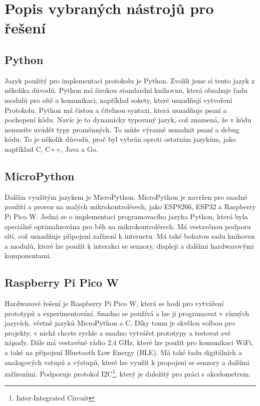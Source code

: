 \documentclass[12pt]{report}			%
\begin{document}
\section{Popis vybraných  nástrojů pro řešení}

\subsection{Python}

Jazyk použitý pro implementaci protokolu je Python. Zvolili jsme si tento jazyk z několika důvodů. 
Python má širokou standardní knihovnu, která obsahuje řadu modulů pro sítě a komunikaci, například sokety, které usnadňují vytvoření Protokolu.
Python má čistou a čitelnou syntaxi, která usnadňuje psaní a pochopení kódu. Navíc je to dynamicky typovaný jazyk, což znamená, že v kódu nemusíte uvádět typy proměnných. To může výrazně usnadnit psaní a debug kódu.
To je několik důvodů, proč byl vybrán oproti ostatním jazykům, jako například C, C++, Java a Go.

\subsection{MicroPython}

Dalším využitým jazykem je MicroPython. MicroPython je navržen pro snadné použití a provoz na malých mikrokontrolérech, jako ESP8266, ESP32 a Raspberry Pi Pico W. Jedná se o implementaci programovacího jazyka Python, která byla speciálně optimalizována pro běh na mikrokontrolérech. Má vestavěnou podporu sítí, což usnadňuje připojení zařízení k internetu. Má také bohatou sadu knihoven a modulů, které lze použít k interakci se senzory, displeji a dalšími hardwarovými komponentami.

\subsection{Raspberry Pi Pico W }

Hardwarové řešení je Raspberry Pi Pico W, která se hodí pro vytváření prototypů a experimentování. Snadno se používá a lze ji programovat v různých jazycích, včetně jazyků MicroPython a C. Díky tomu je skvělou volbou pro projekty, v nichž chcete rychle a snadno vytvářet prototypy a testovat své nápady. Dále má vestavěné rádio 2,4 GHz, které lze použít pro komunikaci WiFi, a také na připojení Bluetooth Low Energy (BLE). Má také řadu digitálních a analogových vstupů a výstupů, které lze využít k propojení se senzory a dalšími zařízeními. Podporuje protokol I2C\footnote{Inter-Integrated Circuit}, který je duležitý pro práci s akcelometrem.  
\end{document}

